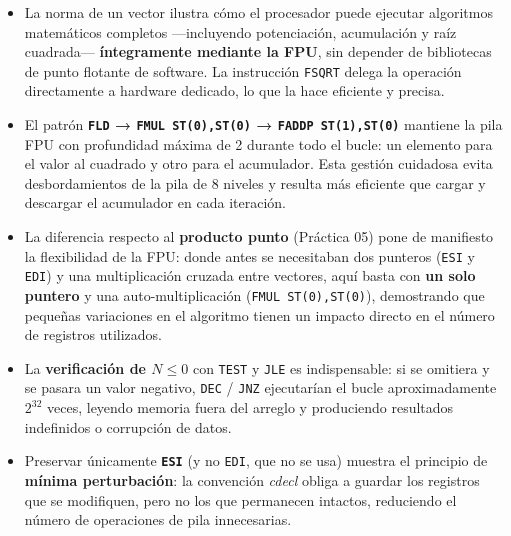 \documentclass[12pt, letterpaper]{article}
\begin{document}
\begin{itemize}
    \item La norma de un vector ilustra cómo el procesador puede ejecutar algoritmos matemáticos completos —incluyendo potenciación, acumulación y raíz cuadrada— \textbf{íntegramente mediante la FPU}, sin depender de bibliotecas de punto flotante de software. La instrucción \texttt{FSQRT} delega la operación directamente a hardware dedicado, lo que la hace eficiente y precisa.

    \item El patrón \textbf{\texttt{FLD} → \texttt{FMUL ST(0),ST(0)} → \texttt{FADDP ST(1),ST(0)}} mantiene la pila FPU con profundidad máxima de 2 durante todo el bucle: un elemento para el valor al cuadrado y otro para el acumulador. Esta gestión cuidadosa evita desbordamientos de la pila de 8 niveles y resulta más eficiente que cargar y descargar el acumulador en cada iteración.

    \item La diferencia respecto al \textbf{producto punto} (Práctica 05) pone de manifiesto la flexibilidad de la FPU: donde antes se necesitaban dos punteros (\texttt{ESI} y \texttt{EDI}) y una multiplicación cruzada entre vectores, aquí basta con \textbf{un solo puntero} y una auto-multiplicación (\texttt{FMUL ST(0),ST(0)}), demostrando que pequeñas variaciones en el algoritmo tienen un impacto directo en el número de registros utilizados.

    \item La \textbf{verificación de $N \leq 0$} con \texttt{TEST} y \texttt{JLE} es indispensable: si se omitiera y se pasara un valor negativo, \texttt{DEC} / \texttt{JNZ} ejecutarían el bucle aproximadamente $2^{32}$ veces, leyendo memoria fuera del arreglo y produciendo resultados indefinidos o corrupción de datos.

    \item Preservar únicamente \textbf{\texttt{ESI}} (y no \texttt{EDI}, que no se usa) muestra el principio de \textbf{mínima perturbación}: la convención \textit{cdecl} obliga a guardar los registros que se modifiquen, pero no los que permanecen intactos, reduciendo el número de operaciones de pila innecesarias.
\end{itemize}
\end{document}
